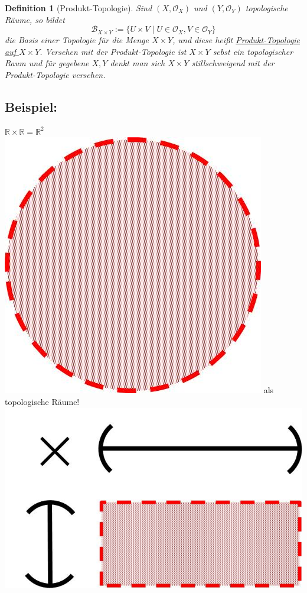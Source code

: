 \documentclass[a4paper,11pt,notitlepage]{report}
\newtheorem{definition}{Definition}[chapter]
\newcommand{\R}{{\ensuremath{\mathbb{R}}}}
\newcommand{\OO}{{\ensuremath{\mathcal{O}}}}
\newenvironment{bsp}[1]
{
\setlength{\fboxsep}{10pt}
\subsection*{Beispiel: #1}
\begin{upshape}
}
{
\end{upshape}
}
\begin{document}
\begin{definition}[Produkt-Topologie]
	Sind $(X, \OO_X)$ und $(Y, \OO_Y)$ topologische Räume, so bildet $$\mathcal{B}_{X \times Y} := \{U \times V \mid U \in \OO_X, V \in \OO_Y\}$$
	die Basis einer Topologie für die Menge $X \times Y$, und diese heißt \underline{Produkt-Topologie auf $X \times Y$}.
	\newline
	Versehen mit der Produkt-Topologie ist $X \times Y$ sebst ein topologischer Raum und für gegebene $X, Y$ denkt man sich $X \times Y$ stillschweigend mit der Produkt-Topologie versehen.
\end{definition}

\begin{bsp}{}
	$\R \times \R = \R^2$ \includegraphics[scale=0.06]{images/offener_Kreis.jpg}
	als topologische Räume!
\includegraphics[scale=0.4]{images/Produkt_RxR.jpg} 

\end{bsp}
\end{document}
